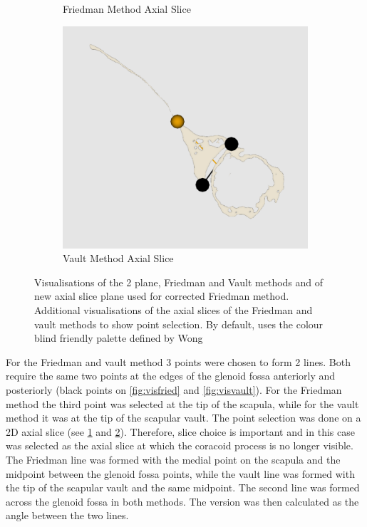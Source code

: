 \begin{figure}
\begin{center}
\begin{subfigure}[b]{0.30\linewidth}
			\caption{\label{fig:visfried2D}Friedman Method Axial Slice}
		\end{subfigure}	
                \begin{subfigure}[b]{0.30\linewidth}
			\includegraphics[width=\linewidth]{figures/vault_vis2D.png}
			\caption{\label{fig:visvault2D}Vault Method Axial Slice}
		\end{subfigure}	
	\end{center}
	\caption{\label{fig:visualisations}Visualisations of the 2 plane, Friedman and Vault methods and of new axial slice plane used for corrected Friedman method. Additional visualisations of the axial slices of the Friedman and vault methods to show point selection. By default, \sksglenoid uses the colour blind friendly palette defined by Wong\cite{bang2011}}
\end{figure}

For the Friedman and vault method 3 points were chosen to form 2 lines. Both require the same two points at the edges of the glenoid fossa anteriorly and posteriorly (black points on \ref{fig:visfried} and \ref{fig:visvault}). For the Friedman method the third point was selected at the tip of the scapula, while for the vault method it was at the tip of the scapular vault. The point selection was done on a 2D axial slice (see \ref{fig:visfried2D} and \ref{fig:visvault2D}). Therefore, slice choice is important and in this case was selected as the axial slice at which the coracoid process is no longer visible. The Friedman line was formed with the medial point on the scapula and the midpoint between the glenoid fossa points, while the vault line was formed with the tip of the scapular vault and the same midpoint. The second line was formed across the glenoid fossa in both methods. The version was then calculated as the angle between the two lines. 


